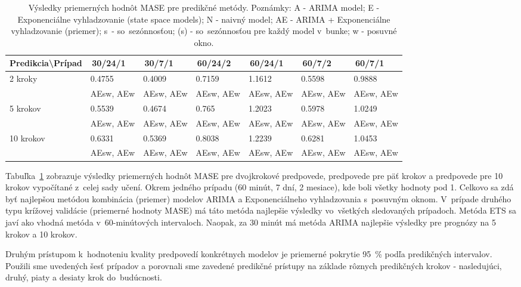 \documentclass[thesismargins, thesislinespacing, openright, upjsfrontpage]{rnthesis}
\begin{document}
\begin{table}[h]
    \centering
    \footnotesize 
    \begin{tabular}{|p{3cm}|p{1.5cm}|p{1.5cm}|p{1.5cm}|p{1.5cm}|p{1.5cm}|p{1.5cm}|} \hline
        Predikcia\textbackslash Prípad & \,30/24/1\, & \,30/7/1\, & \,60/24/2\, & \,60/24/1\, & \,60/7/2\, & \,60/7/1\, \\    
        \hline\hline
       \multirow{2}{*}{2 kroky} & 0.4755 & 0.4009 & 0.7159 & 1.1612 & 0.5598 & 0.9888 \\
       & AEsw, AEw & AEsw, AEw & AEsw, AEw & AEsw, AEw & AEsw, AEw & AEsw, AEw  \\
        \hline
        \multirow{2}{*}{5 krokov} & 0.5539 & 0.4674 & 0.765 & 1.2023 & 0.5978 & 1.0249 \\
        & AEsw, AEw & AEsw, AEw & AEsw, AEw & AEsw, AEw & AEsw, AEw & AEsw, AEw  \\
        \hline
        \multirow{2}{*}{10 krokov} & 0.6331 & 0.5369 & 0.8038 & 1.2239 & 0.6281 & 1.0453 \\
        & AEsw, AEw & AEsw, AEw & AEsw, AEw & AEsw, AEw & AEsw, AEw & AEsw, AEw  \\
        \hline     
    \end{tabular}
    \caption{Výsledky priemerných hodnôt MASE pre predikčné metódy. Poznámky: A - ARIMA model; E - Exponenciálne vyhladzovanie (state space models); N - naivný model; AE - ARIMA + Exponenciálne vyhladzovanie (priemer); s~- so~sezónnosťou; (s) - so~sezónnosťou pre každý model v~bunke; w - posuvné okno.}
    \label{tab:mase}
\end{table}

Tabuľka~\ref{tab:mase} zobrazuje výsledky priemerných hodnôt MASE pre dvojkrokové predpovede, predpovede pre päť krokov a predpovede pre 10 krokov vypočítané z~celej sady učení. Okrem jedného prípadu (60 minút, 7 dní, 2 mesiace), kde boli všetky hodnoty pod 1. Celkovo sa zdá byť najlepšou metódou kombinácia (priemer) modelov ARIMA a Exponenciálneho vyhladzovania s~posuvným oknom. V~prípade druhého typu krížovej validácie (priemerné hodnoty MASE) má táto metóda najlepšie výsledky vo~všetkých sledovaných prípadoch. Metóda ETS sa javí ako vhodná metóda v~60-minútových intervaloch. Naopak, za 30 minút má metóda ARIMA najlepšie výsledky pre prognózy na 5 krokov a 10 krokov.


Druhým prístupom k~hodnoteniu kvality predpovedí konkrétnych modelov je priemerné pokrytie 95~\% podľa predikčných intervalov. Použili sme uvedených šesť prípadov a porovnali sme zavedené predikčné prístupy na základe rôznych predikčných krokov - nasledujúci, druhý, piaty a desiaty krok do~budúcnosti.
\end{document}
